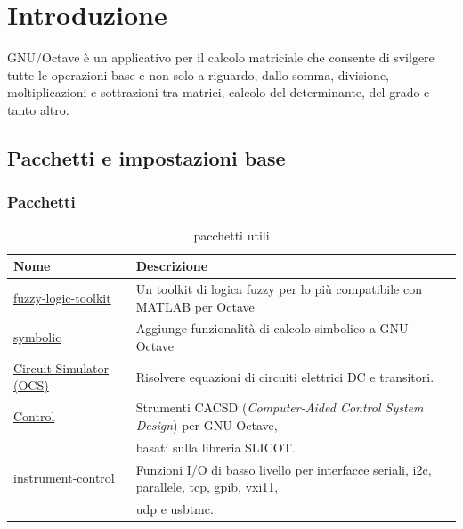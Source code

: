 \chapter{Introduzione}
\label{chap:intro}
\begin{defi}
  GNU/Octave è un applicativo per il calcolo matriciale che consente di svilgere
  tutte le operazioni base e non solo a riguardo, dallo somma, divisione,
  moltiplicazioni e sottrazioni tra matrici, calcolo del determinante, del
  grado e tanto altro.
\end{defi}

\section{Pacchetti e impostazioni base}
\label{sec:packbase}

\subsection{Pacchetti}
\label{sec:pack}

\begin{table}[th]
  \centering
  \begin{tabular}{ll}
    {\bf Nome} & {\bf Descrizione}\\\hline
    \href{https://gnu-octave.github.io/packages/fuzzy-logic-toolkit/}{fuzzy-logic-toolkit} & Un toolkit di logica fuzzy per lo più
                                                                                               compatibile con MATLAB per Octave \\\hline
    \href{https://gnu-octave.github.io/packages/symbolic/}{symbolic} & Aggiunge funzionalità di calcolo simbolico a GNU
                        Octave \\\hline
    \href{https://gnu-octave.github.io/packages/ocs/}{Circuit Simulator (OCS)} & Risolvere equazioni di circuiti elettrici DC e transitori. \\\hline
    \href{https://gnu-octave.github.io/packages/control/}{Control} & Strumenti CACSD ({\it Computer-Aided Control System
                       Design}) per GNU Octave,\\ &basati sulla libreria SLICOT.\\\hline
    \href{https://gnu-octave.github.io/packages/instrument-control/}{instrument-control} & Funzioni I/O di basso livello per interfacce seriali, i2c, parallele, tcp, gpib, vxi11,\\
               &udp e usbtmc.\\\hline 
  \end{tabular}
  \caption{pacchetti utili}
  \label{tab:pachutil}
\end{table}

